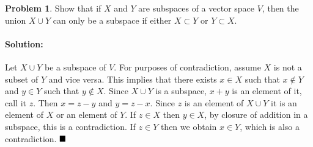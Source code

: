\documentclass[]{article}
\theoremstyle{definition}
\newtheorem{problem}{Problem}
\newenvironment{solution}{\paragraph{Solution:}}{\hfill$\blacksquare \\$}
\begin{document}
\begin{problem}
	Show that if $X$ and $Y$ are subspaces of a vector space $V$, then the union $X \cup Y$ can only be a subspace if either $X \subset Y$ or $Y \subset X$.
\end{problem}
\begin{solution}
	Let $X \cup Y$ be a subspace of $V$. For purposes of contradiction, assume $X$ is not a subset of $Y$ and vice versa. This implies that there exists $x \in X$ such that $x \notin Y$ and $y \in Y$ such that $y \notin X$. Since $X \cup Y$ is a subspace, $x+y$ is an element of it, call it $z$. Then $x = z -y$ and $y = z - x$. Since $z$ is an element of $X \cup Y$ it is an element of $X$ or an element of $Y$. If $z \in X$ then $y \in X$, by closure of addition in a subspace, this is a contradiction. If $z \in Y$ then we obtain $x \in Y$, which is also a contradiction.
\end{solution}
\end{document}
